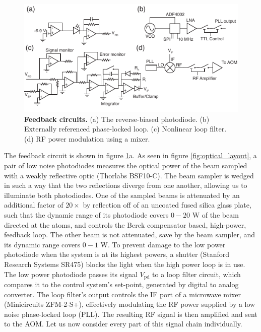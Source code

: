 \documentclass[twocolumn,aps,pra,showpacs,preprintnumbers,bibnotes]{revtex4-1}
\begin{document}
\begin{figure}
  \begin{center}
    \includegraphics{fig/circuits.pdf}
    \caption{\textbf{Feedback circuits.} (a) The reverse-biased photodiode. (b) Externally referenced phase-locked loop. (c) Nonlinear loop filter. (d) RF power modulation using a mixer.}\label{fig:circuits}
  \end{center}
\end{figure}
The feedback circuit is shown in figure \ref{fig:circuits}a. As seen in figure \ref{fig:optical_layout}, a pair of low noise photodiodes measures the optical power of the beam sampled with a weakly reflective optic (Thorlabs BSF10-C). 
The beam sampler is wedged in such a way that the two reflections diverge from one another, allowing us to illuminate both photodiodes. 
One of the sampled beams is attenuated by an additional factor of $20\times$ by reflection off of an uncoated fused silica glass plate, such that the dynamic range of its photodiode covers $0-20$ W of the beam directed at the atoms, and controls the Berek compensator based, high-power, feedback loop. 
The other beam is not attenuated, save by the beam sampler, and its dynamic range covers $0-1$ W.
To prevent damage to the low power photodiode when the system is at its highest powers, a shutter (Stanford Research Systems SR475) blocks the light when the high power loop is in use.
The low power photodiode passes its signal $V_{\mathrm{pd}}$ to a loop filter circuit, which compares it to the control system's set-point, generated by digital to analog converter.
The loop filter's output controls the IF port of a microwave mixer (Minicircuits ZFM-2-S+), effectively modulating the RF power supplied by a low noise phase-locked loop (PLL).
The resulting RF signal is then amplified and sent to the AOM.
Let us now consider every part of this signal chain individually.
\end{document}
